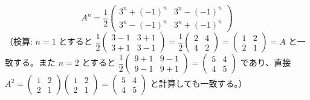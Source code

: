 \documentclass[a4paper,11pt]{article}
\begin{document}
\[
\boxed{\; A^{n} = \frac{1}{2}\begin{pmatrix} 3^{n} + (-1)^{n} & 3^{n} - (-1)^{n} \\ 3^{n} - (-1)^{n} & 3^{n} + (-1)^{n} \end{pmatrix} \;}
\]
（検算: $n=1$ とすると $\dfrac12\begin{pmatrix}3-1 & 3+1\\3+1&3-1\end{pmatrix} = \dfrac12\begin{pmatrix}2&4\\4&2\end{pmatrix} = \begin{pmatrix}1&2\\2&1\end{pmatrix} = A$ と一致する。また $n=2$ とすると $\dfrac12\begin{pmatrix}9+1&9-1\\9-1&9+1\end{pmatrix}=\begin{pmatrix}5&4\\4&5\end{pmatrix}$ であり、直接 $A^2=\begin{pmatrix}1&2\\2&1\end{pmatrix}\begin{pmatrix}1&2\\2&1\end{pmatrix}=\begin{pmatrix}5&4\\4&5\end{pmatrix}$ と計算しても一致する。）
\end{document}
